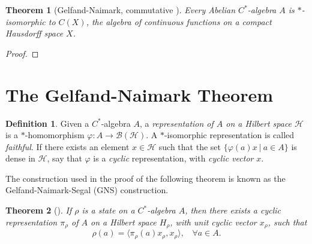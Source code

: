 \documentclass[12pt,a4paper]{report}
\theoremstyle{plain}
\newtheorem{thm}{Theorem}
\theoremstyle{definition}
\newtheorem{defn}{Definition}
\newcommand{\1}{\mathbbm{1}}
\renewcommand{\H}{\mathcal{H}}
\newcommand{\B}{\mathcal{B}}
\newcommand{\BH}{\mathcal{\B(\H)}}
\renewcommand{\phi}{\varphi}
\newcommand{\CX}{C(X)}
\begin{document}
\begin{thm}[{Gelfand-Naimark, commutative \cite[4.4.3]{kadison83}}] 
	Every Abelian $C^\ast$-algebra $A$ is $\ast$-isomorphic to $\CX$, the algebra of continuous
	functions on a compact Hausdorff space $X$.
\end{thm}
\begin{proof}
	
	
\end{proof}%


	
\section{The Gelfand-Naimark Theorem}

\begin{defn}
	Given a $C^\ast$-algebra $A$, a \emph{representation of $A$ on a Hilbert space $\H$} 
	is a $\ast$-homomorphism $\phi: A \to \BH$. 
	A $\ast$-isomorphic representation is called \emph{faithful}.
	If there exists an element $x\in\H$ such that the set $\{\phi(a)x ~|~ a\in A\}$ is dense in $\H$, 
	say that $\phi$ is a \emph{cyclic} representation, with \emph{cyclic vector} $x$.
\end{defn}	
The construction used in the proof of the following theorem is known as the Gelfand-Naimark-Segal (GNS)
construction.
\begin{thm}[{\cite[4.5.2]{kadison83}}]
	If $\rho$ is a state on a $C^\ast$-algebra $A$, then there exists a cyclic representation 
	$\pi_\rho$ of $A$ on a Hilbert space ${H}_\rho$, with unit cyclic vector $x_\rho$, such that 
	\[ 
		\rho(a)= \langle \pi_\rho (a) x_\rho, x_\rho \rangle, ~~~~ \forall a \in A.
	\]
\end{thm}
\end{document}
